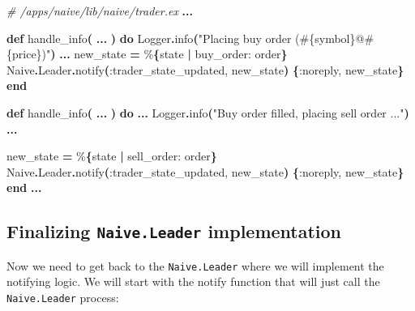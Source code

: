 \documentclass[
  oneside]{book}
\newenvironment{Shaded}{\begin{snugshade}}{\end{snugshade}}
\newcommand{\CommentTok}[1]{\textcolor[rgb]{0.56,0.35,0.01}{\textit{#1}}}
\newcommand{\ConstantTok}[1]{\textcolor[rgb]{0.56,0.35,0.01}{#1}}
\newcommand{\FunctionTok}[1]{\textcolor[rgb]{0.13,0.29,0.53}{\textbf{#1}}}
\newcommand{\KeywordTok}[1]{\textcolor[rgb]{0.13,0.29,0.53}{\textbf{#1}}}
\newcommand{\NormalTok}[1]{#1}
\newcommand{\OperatorTok}[1]{\textcolor[rgb]{0.81,0.36,0.00}{\textbf{#1}}}
\newcommand{\OtherTok}[1]{\textcolor[rgb]{0.56,0.35,0.01}{#1}}
\newcommand{\StringTok}[1]{\textcolor[rgb]{0.31,0.60,0.02}{#1}}
\newcommand{\VariableTok}[1]{\textcolor[rgb]{0.00,0.00,0.00}{#1}}
\begin{document}
\begin{Shaded}
\begin{Highlighting}[]
  \CommentTok{\# /apps/naive/lib/naive/trader.ex}
  \OperatorTok{...}

  \KeywordTok{def}\NormalTok{ handle\_info}\FunctionTok{(}
        \OperatorTok{...}
      \FunctionTok{)} \KeywordTok{do}
    \ConstantTok{Logger}\OperatorTok{.}\NormalTok{info}\FunctionTok{(}\StringTok{"Placing buy order (}\OtherTok{\#\{}\NormalTok{symbol}\OtherTok{\}}\StringTok{@}\OtherTok{\#\{}\NormalTok{price}\OtherTok{\}}\StringTok{)"}\FunctionTok{)}
    \OperatorTok{...}
\NormalTok{    new\_state }\OperatorTok{=}\NormalTok{ \%}\FunctionTok{\{}\NormalTok{state }\OperatorTok{|} \VariableTok{buy\_order:}\NormalTok{ order}\FunctionTok{\}}
    \ConstantTok{Naive}\OperatorTok{.}\ConstantTok{Leader}\OperatorTok{.}\NormalTok{notify}\FunctionTok{(}\VariableTok{:trader\_state\_updated}\NormalTok{, new\_state}\FunctionTok{)}
    \FunctionTok{\{}\VariableTok{:noreply}\NormalTok{, new\_state}\FunctionTok{\}}
  \KeywordTok{end}

  \KeywordTok{def}\NormalTok{ handle\_info}\FunctionTok{(}
        \OperatorTok{...}
      \FunctionTok{)} \KeywordTok{do}
    \OperatorTok{...}
    \ConstantTok{Logger}\OperatorTok{.}\NormalTok{info}\FunctionTok{(}\StringTok{"Buy order filled, placing sell order ..."}\FunctionTok{)}  
    \OperatorTok{...}

\NormalTok{    new\_state }\OperatorTok{=}\NormalTok{ \%}\FunctionTok{\{}\NormalTok{state }\OperatorTok{|} \VariableTok{sell\_order:}\NormalTok{ order}\FunctionTok{\}}
    \ConstantTok{Naive}\OperatorTok{.}\ConstantTok{Leader}\OperatorTok{.}\NormalTok{notify}\FunctionTok{(}\VariableTok{:trader\_state\_updated}\NormalTok{, new\_state}\FunctionTok{)}
    \FunctionTok{\{}\VariableTok{:noreply}\NormalTok{, new\_state}\FunctionTok{\}}
  \KeywordTok{end}
  \OperatorTok{...}
\end{Highlighting}
\end{Shaded}

\subsection{\texorpdfstring{Finalizing \texttt{Naive.Leader} implementation}{Finalizing Naive.Leader implementation}}\label{finalizing-naive.leader-implementation}

Now we need to get back to the \texttt{Naive.Leader} where we will implement the notifying logic. We will start with the notify function that will just call the \texttt{Naive.Leader} process:
\end{document}
